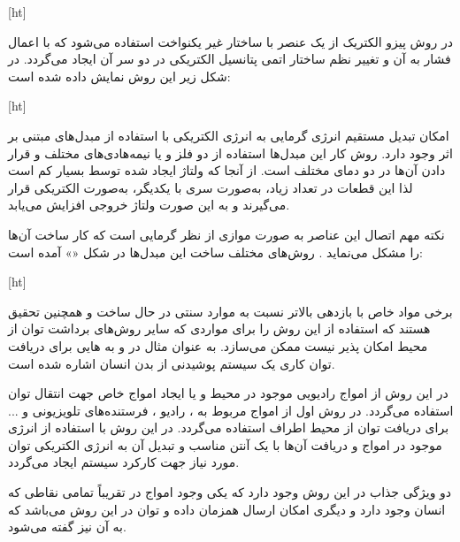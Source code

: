 [ht]


در روش پیزو الکتریک از یک عنصر با ساختار غیر یکنواخت استفاده می‌شود که با اعمال فشار به آن و تغییر نظم ساختار اتمی پتانسیل الکتریکی در دو سر آن ایجاد می‌گردد. در شکل زیر این روش نمایش داده شده است: 

[ht]


امکان تبدیل مستقیم انرژی گرمایی به انرژی الکتریکی با استفاده از مبدل‌های مبتنی بر اثر  وجود دارد. روش کار این مبدل‌ها استفاده از دو فلز و یا نیمه‌هادی‌های مختلف و قرار دادن آن‌ها در دو دمای مختلف است. از آنجا که ولتاژ ایجاد شده توسط  بسیار کم است لذا این قطعات در تعداد زیاد، به‌صورت سری با یکدیگر، به‌صورت الکتریکی قرار می‌گیرند و به این صورت ولتاژ خروجی افزایش می‌یابد.

نکته مهم اتصال این عناصر به صورت موازی از نظر گرمایی است که کار ساخت آن‌ها را مشکل می‌نماید . روش‌های مختلف ساخت این مبدل‌ها در شکل «» آمده است:


[ht]


برخی مواد خاص با بازدهی بالاتر نسبت به موارد سنتی  در حال ساخت و همچنین تحقیق هستند که استفاده از این روش را برای مواردی که سایر روش‌های برداشت توان از محیط امکان پذیر نیست ممکن می‌سازد. به عنوان مثال در  و  به  هایی برای دریافت توان کاری یک سیستم پوشیدنی از بدن انسان اشاره شده است.





در این روش از امواج رادیویی موجود در محیط و یا ایجاد امواج خاص جهت انتقال توان استفاده می‌گردد. در روش اول از امواج مربوط به ، رادیو ، فرستنده‌های تلویزیونی و ... برای دریافت توان از محیط اطراف استفاده می‌گردد. در این روش با استفاده از انرژی موجود در امواج و دریافت آن‌ها با یک آنتن مناسب و تبدیل آن به انرژی الکتریکی توان مورد نیاز جهت کارکرد سیستم ایجاد می‌گردد.


دو ویژگی جذاب در این روش وجود دارد که یکی وجود امواج در تقریباً تمامی نقاطی که انسان وجود دارد و دیگری امکان ارسال همزمان داده و توان در این روش می‌باشد که به آن  نیز گفته می‌شود.


